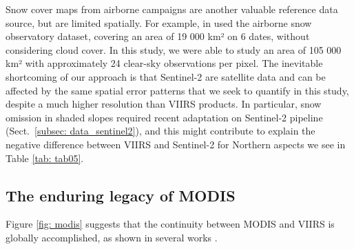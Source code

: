\documentclass[tc, manuscript]{copernicus}
\begin{document}
Snow cover maps from airborne campaigns are another valuable reference data source, but are limited spatially. For example, in \cite{stillinger_landsat_2023} used the airborne snow observatory dataset, covering an area of 19 000 km² on 6 dates, without considering cloud cover. In this study, we were able to study an area of 105 000 km² with approximately 24 clear-sky observations per pixel. The inevitable shortcoming of our approach is that Sentinel-2 are satellite data and can be affected by the same spatial error patterns \citep{muhuri_performance_2021} that we seek to quantify in this study, despite a much higher resolution than VIIRS products. In particular, snow omission in shaded slopes \citep{gascoin_theia_2019} required recent adaptation on Sentinel-2 pipeline (Sect.~\ref{subsec: data_sentinel2}), and this might contribute to explain the negative difference between VIIRS and Sentinel-2 for Northern aspects we see in Table \ref{tab: tab05}. 



\subsection{The enduring legacy of MODIS}
\label{subsec: modis}


Figure \ref{fig: modis} suggests that the continuity between  MODIS and VIIRS is globally accomplished, as shown in several works \citep{riggs_continuity_2020, hall_comparison_2024, rittger_evaluation_2021,zhang_comparative_2020}.  
\end{document}

